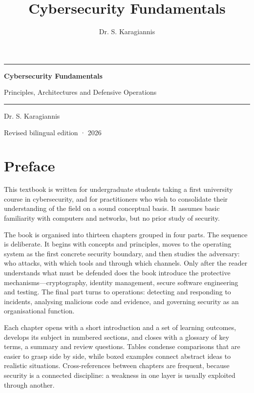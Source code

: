 \documentclass[11pt,openany]{book}
\title{Cybersecurity Fundamentals}
\author{Dr. S. Karagiannis}
\begin{document}
\frontmatter
\begin{titlepage}
  \centering\sffamily
  \vspace*{3cm}
  {\color{accent}\rule{\linewidth}{1.2pt}}\par\vspace{1cm}
  {\Huge\bfseries Cybersecurity Fundamentals\par}
  \vspace{0.6cm}
  {\Large Principles, Architectures and Defensive Operations\par}
  \vspace{1cm}
  {\color{accent}\rule{\linewidth}{1.2pt}}\par
  \vfill
  {\large Dr. S. Karagiannis\par}
  \vspace{0.3cm}
  {\small Revised bilingual edition · 2026\par}
\end{titlepage}
\tableofcontents
\chapter*{Preface}

This textbook is written for undergraduate students taking a first university course in cybersecurity, and for practitioners who wish to consolidate their understanding of the field on a sound conceptual basis. It assumes basic familiarity with computers and networks, but no prior study of security.

The book is organised into thirteen chapters grouped in four parts. The sequence is deliberate. It begins with concepts and principles, moves to the operating system as the first concrete security boundary, and then studies the adversary: who attacks, with which tools and through which channels. Only after the reader understands what must be defended does the book introduce the protective mechanisms—cryptography, identity management, secure software engineering and testing. The final part turns to operations: detecting and responding to incidents, analysing malicious code and evidence, and governing security as an organisational function.

Each chapter opens with a short introduction and a set of learning outcomes, develops its subject in numbered sections, and closes with a glossary of key terms, a summary and review questions. Tables condense comparisons that are easier to grasp side by side, while boxed examples connect abstract ideas to realistic situations. Cross-references between chapters are frequent, because security is a connected discipline: a weakness in one layer is usually exploited through another.
\end{document}
